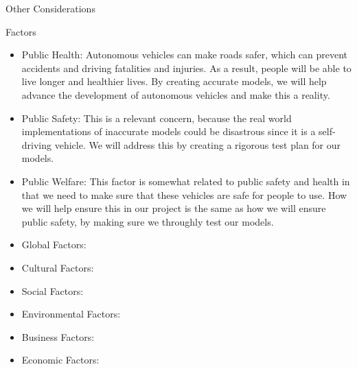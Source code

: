 \documentclass{beamer}
\begin{document}

\begin{frame}{Other Considerations}
  \begin{block}{Factors}
  	\begin{small}
      \begin{itemize}
        \item Public Health: Autonomous vehicles can make roads safer, which can prevent accidents
and driving fatalities and injuries. As a result, people will be able to live longer and
healthier lives. By creating accurate models, we will help advance the development of
autonomous vehicles and make this a reality.
		\item Public Safety: This is a relevant concern, because the real world implementations of inaccurate models could be disastrous since it is a self-driving vehicle. We will address this by creating a rigorous test plan for our models.
		\item Public Welfare: This factor is somewhat related to public safety and health in that we need to make sure that these vehicles are safe for people to use. How we will help
ensure this in our project is the same as how we will ensure public safety, by making sure we throughly test our models.
		\item Global Factors: 
		\item Cultural Factors: 
		\item Social Factors: 
		\item Environmental Factors: 
		\item Business Factors: 
		\item Economic Factors: 
      \end{itemize}
     \end{small}
  \end{block}
\end{frame}

\end{document}
